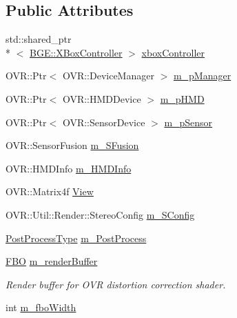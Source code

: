 \subsection*{Public Attributes}
\begin{DoxyCompactItemize}
\item 
std\-::shared\-\_\-ptr\\*
$<$ \hyperlink{class_b_g_e_1_1_x_box_controller}{B\-G\-E\-::\-X\-Box\-Controller} $>$ \hyperlink{class_b_g_e_1_1_rift_controller_a32502254ff8a624efd6ebb872fd803a5}{xbox\-Controller}
\item 
O\-V\-R\-::\-Ptr$<$ O\-V\-R\-::\-Device\-Manager $>$ \hyperlink{class_b_g_e_1_1_rift_controller_a08d378cc60cf780d041a732e11d69bce}{m\-\_\-p\-Manager}
\item 
O\-V\-R\-::\-Ptr$<$ O\-V\-R\-::\-H\-M\-D\-Device $>$ \hyperlink{class_b_g_e_1_1_rift_controller_a70060a4cca185240ef637898fe58a9a4}{m\-\_\-p\-H\-M\-D}
\item 
O\-V\-R\-::\-Ptr$<$ O\-V\-R\-::\-Sensor\-Device $>$ \hyperlink{class_b_g_e_1_1_rift_controller_a4e43e42cb597307332164d1bbb25e354}{m\-\_\-p\-Sensor}
\item 
O\-V\-R\-::\-Sensor\-Fusion \hyperlink{class_b_g_e_1_1_rift_controller_a5b1eadfb98b420bd3ea0f116cc55a6fd}{m\-\_\-\-S\-Fusion}
\item 
O\-V\-R\-::\-H\-M\-D\-Info \hyperlink{class_b_g_e_1_1_rift_controller_a9d02073c01d376140e65952ae7676d55}{m\-\_\-\-H\-M\-D\-Info}
\item 
O\-V\-R\-::\-Matrix4f \hyperlink{class_b_g_e_1_1_rift_controller_a928de952c8f9d78d6c60dcd51e4caab9}{View}
\item 
O\-V\-R\-::\-Util\-::\-Render\-::\-Stereo\-Config \hyperlink{class_b_g_e_1_1_rift_controller_a2b05217b23794266f4502f3b259f1ce6}{m\-\_\-\-S\-Config}
\item 
\hyperlink{class_b_g_e_1_1_rift_controller_a87049aa35e2aff9e87fcdee351e3ff02}{Post\-Process\-Type} \hyperlink{class_b_g_e_1_1_rift_controller_a275b202eee8521782b70d02144c81a6e}{m\-\_\-\-Post\-Process}
\item 
\hyperlink{struct_f_b_o}{F\-B\-O} \hyperlink{class_b_g_e_1_1_rift_controller_a54f7b611ddef0e08d4a45586d4bca2e4}{m\-\_\-render\-Buffer}
\begin{DoxyCompactList}\small\item\em Render buffer for O\-V\-R distortion correction shader. \end{DoxyCompactList}\item 
int \hyperlink{class_b_g_e_1_1_rift_controller_a25129282cc3e860814de35f9ba45986e}{m\-\_\-fbo\-Width}

\end{DoxyCompactItemize}
